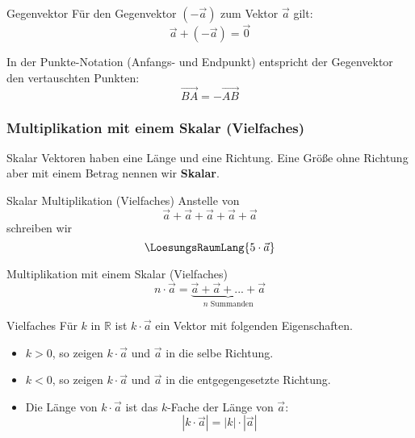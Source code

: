\begin{bemerkung}{Gegenvektor}{}
  Für den Gegenvektor $(-\vec{a})$ zum Vektor $\vec{a}$ gilt:
  $$\vec{a} + (-\vec{a}) = \vec{0}$$
  
\end{bemerkung}


\begin{bemerkung}{}{}
  In der Punkte-Notation (Anfangs- und Endpunkt) entspricht der
  Gegenvektor  den vertauschten Punkten:
  $$\overrightarrow{BA} = - \overrightarrow{AB}$$
\end{bemerkung}


\newpage


\subsubsection{Multiplikation mit einem Skalar (Vielfaches)}
\begin{definition}{Skalar}{}
  Vektoren haben eine Länge und eine Richtung. Eine Größe ohne
  Richtung aber mit einem Betrag nennen wir \textbf{Skalar}. 
\end{definition}

\begin{beispiel}{Skalar Multiplikation (Vielfaches)}{}
  Anstelle von
  $$\vec{a}+\vec{a}+\vec{a}+\vec{a}+\vec{a}$$
  schreiben wir
  $$\LoesungsRaumLang{5\cdot{}\vec{a}}$$
\end{beispiel}

\begin{definition}{Multiplikation mit einem Skalar (Vielfaches)}{}
  $$n\cdot{}\vec{a} = \underbrace{\vec{a} + \vec{a} + ... + \vec{a}}_{n \text{ Summanden}}$$
\end{definition}


\begin{definition}{Vielfaches}{}
  Für $k$ in $\mathbb{R}$ ist $k\cdot{}\vec{a}$ ein Vektor mit
  folgenden Eigenschaften.

  \begin{itemize}
  \item $k>0$, so zeigen $k\cdot{}\vec{a}$ und $\vec{a}$ in die selbe Richtung.
  \item $k<0$, so zeigen $k\cdot{}\vec{a}$ und $\vec{a}$ in die entgegengesetzte Richtung.
  \item Die Länge von $k\cdot{}\vec{a}$ ist das $k$-Fache der Länge
    von $\vec{a}$: $$|k\cdot{}\vec{a}| = |k|\cdot{}|\vec{a}|$$
   \end{itemize}
\end{definition}

